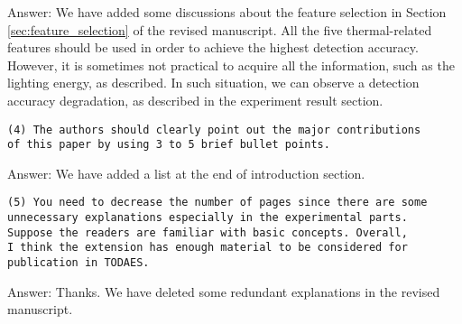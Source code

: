 Answer: We have added some discussions about the feature selection in
Section \ref{sec:feature_selection} of the revised manuscript. All the five thermal-related
features should be used in order to achieve the highest detection accuracy.
However, it is sometimes not practical to acquire all the information,
such as the lighting energy, as described. In such situation, we can
observe a detection accuracy degradation, as described
in the experiment result section.




\begin{verbatim}
(4) The authors should clearly point out the major contributions
of this paper by using 3 to 5 brief bullet points.
\end{verbatim}

Answer: We have added a list at the end of introduction section.


\begin{verbatim}
(5) You need to decrease the number of pages since there are some
unnecessary explanations especially in the experimental parts.
Suppose the readers are familiar with basic concepts. Overall,
I think the extension has enough material to be considered for
publication in TODAES.
\end{verbatim}

Answer: Thanks. We have deleted some redundant explanations in the revised manuscript.
